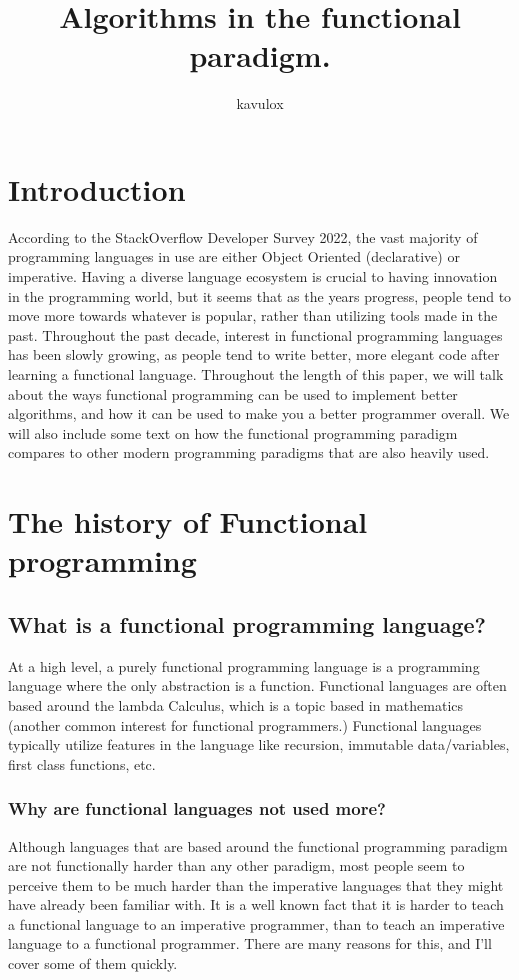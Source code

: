\documentclass{report}
\title{Algorithms in the functional paradigm.}
\author{kavulox}
\begin{document}
\maketitle


\tableofcontents



\chapter{Introduction}

According to the StackOverflow Developer Survey 2022, the vast majority of programming languages in use are either Object Oriented (declarative) or imperative. Having a diverse language ecosystem is crucial to having innovation in the programming world, but it seems that as the years progress, people tend to move more towards whatever is popular, rather than utilizing tools made in the past.
Throughout the past decade, interest in functional programming languages has been slowly growing, as people tend to write better, more elegant code after learning a functional language.
Throughout the length of this paper, we will talk about the ways functional programming can be used to implement better algorithms, and how it can be used to make you a better programmer overall. We will also include some text on how the functional programming paradigm compares to other modern programming paradigms that are also heavily used.
\chapter{The history of Functional programming}
\section{What is a functional programming language?}
At a high level, a purely functional programming language is a programming language where the only abstraction is a function. Functional languages are often based around the lambda Calculus, which is a topic based in mathematics (another common interest for functional programmers.) 
Functional languages typically utilize features in the language like recursion, immutable data/variables, first class functions, etc.
\subsection{Why are functional languages not used more?}
Although languages that are based around the functional programming paradigm are not functionally harder than any other paradigm, most people seem to perceive them to be much harder than the imperative languages that they might have already been familiar with.
It is a well known fact that it is harder to teach a functional language to an imperative programmer, than to teach an imperative language to a functional programmer. There are many reasons for this, and I'll cover some of them quickly.
\end{document}
